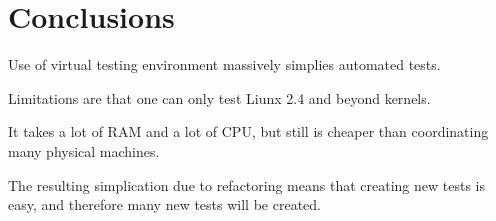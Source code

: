 \section{Conclusions}

Use of virtual testing environment massively simplies automated tests.

Limitations are that one can only test Liunx 2.4 and beyond kernels.

It takes a lot of RAM and a lot of CPU, but still is cheaper than
coordinating many physical machines.

The resulting simplication due to refactoring means that creating new 
tests is easy, and therefore many new tests will be created.


